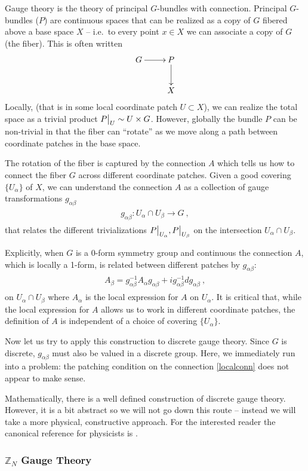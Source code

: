 \documentclass[11pt]{article}
\newcommand{\eq}[1]{\begin{align}\begin{split}#1\end{split}\end{align}}
\begin{document}
Gauge theory is the theory of principal $G$-bundles with connection. Principal $G$-bundles ($P$) are continuous spaces that can be realized as a copy of $G$ fibered above a base space $X$ -- i.e.~to every point $x\in X$ we can associate a copy of $G$ (the fiber). This is often written
\eq{
\xymatrix{
G\ar[r]&P\ar[d]\\
&X
}
}
Locally, (that is in some local coordinate patch $U\subset X$), 
 we can realize the total space as a trivial product $P\big{|}_U \sim U\times G$. However, globally the bundle $P$ can be non-trivial in that the fiber can ``rotate'' as we move along a path between coordinate patches in the base space. 
 
The rotation of the fiber is captured by the connection $A$ which tells us how to connect the fiber $G$ across different coordinate patches. Given a good covering $\{U_\alpha\}$ of $X$, we can understand the connection $A$ as a collection of gauge transformations $g_{\alpha\beta}$ 
 \eq{
 g_{\alpha\beta}:U_\alpha\cap U_\beta\to G~,
}
that relates the different trivializations $P\big{|}_{U_\alpha},P\big{|}_{U_\beta}$ on the intersection $U_\alpha\cap U_\beta$.

Explicitly, when $G$ is a 0-form symmetry group and continuous the connection $A$, which is locally a 1-form, is related between different patches by $g_{\alpha\beta}$:
\eq{\label{localconn}
A_\beta=g_{\alpha\beta}^{-1}A_\alpha g_{\alpha\beta}+i g_{\alpha\beta}^{-1}dg_{\alpha\beta}~,
}
on $U_\alpha\cap U_\beta$ where $A_\alpha$ is the local expression for $A$ on $U_\alpha$. It is critical that, while the local expression for $A$ allows us to work in different coordinate patches, the definition of $A$ is independent of a choice of covering $\{U_\alpha\}$. 

Now let us try to apply this construction to discrete gauge theory. Since $G$ is discrete, $g_{\alpha\beta}$ must also be valued in a discrete group. Here, we immediately run into a problem: the patching condition on the connection \eqref{localconn} does not appear to make sense. 

Mathematically, there is a well defined construction of discrete gauge theory. However, it is a bit abstract so we will not go down this route -- instead we will take a more physical, constructive approach. For the interested reader the canonical reference for physicists   is \cite{Dijkgraaf:1989pz}.


\subsubsection* {$\mathbb{Z}_N$ Gauge Theory}
\end{document}
